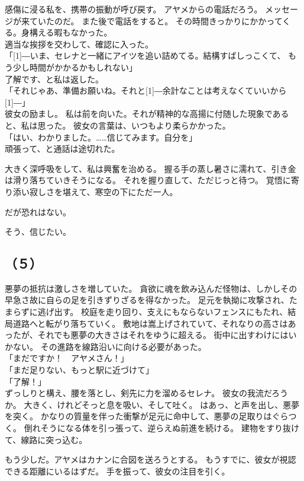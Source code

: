 \documentclass[../IHMain]{subfiles}
\begin{document}
感傷に浸る私を、携帯の振動が呼び戻す。
アヤメからの電話だろう。
メッセージが来ていたのだ。
また後で電話をすると。
その時間きっかりにかかってくる。身構える暇もなかった。\\
適当な挨拶を交わして、確認に入った。\\
「\scalebox{3}[1]{―}いま、セレナと一緒にアイツを追い詰めてる。結構すばしっこくて、
もう少し時間がかかるかもしれない」\\
了解です、と私は返した。\\
「それじゃあ、準備お願いね。それと\scalebox{3}[1]{―}余計なことは考えなくていいから\scalebox{3}[1]{―}」\\
彼女の励まし。
私は前を向いた。それが精神的な高揚に付随した現象であると、私は思った。
彼女の言葉は、いつもより柔らかかった。\\
「はい、わかりました。……信じてみます。自分を」\\
頑張って、と通話は途切れた。

大きく深呼吸をして、私は興奮を治める。
握る手の蒸し暑さに濡れて、引き金は滑り落ちていきそうになる。
それを握り直して、ただじっと待つ。
覚悟に寄り添い寂しさを堪えて、寒空の下にただ一人。

だが恐れはない。

そう、信じたい。

\subsection*{（５）}
悪夢の抵抗は激しさを増していた。
貪欲に魂を飲み込んだ怪物は、しかしその早急さ故に自らの足を引きずりざるを得なかった。
足元を執拗に攻撃され、たまらずに逃げ出す。
校庭を走り回り、支えにもならないフェンスにもたれ、結局道路へと転がり落ちていく。
敷地は嵩上げされていて、それなりの高さはあったが、それでも悪夢の大きさはそれをゆうに超える。
街中に出すわけにはいかない。
その進路を線路沿いに向ける必要があった。\\
「まだですか！　アヤメさん！」\\
「まだ足りない、もっと駅に近づけて」\\
「了解！」\\
ずっしりと構え、腰を落とし、剣先に力を溜めるセレナ。
彼女の我流だろうか。
大きく、けれどそっと息を吸い、そして吐く。
はあっ、と声を出し、悪夢を突く。
かなりの質量を伴った衝撃が足元に命中して、悪夢の足取りはぐらつく。
倒れそうになる体を引っ張って、逆らえぬ前進を続ける。
建物をすり抜けて、線路に突っ込む。

もう少しだ。アヤメはカナンに合図を送ろうとする。
もうすでに、彼女が視認できる距離にいるはずだ。
手を振って、彼女の注目を引く。\\
\end{document}
